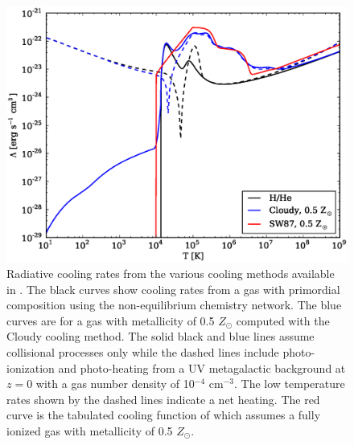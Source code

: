 \begin{figure} \label{fig.cooling}
  \begin{center}
    \includegraphics[width=1.0\textwidth]{figures/cooling_rate.eps}
    \caption{Radiative cooling rates from the various cooling methods
      available in \enzo.  The black curves show cooling rates from a gas
      with primordial composition using the non-equilibrium chemistry
      network.  The blue curves are for a gas with metallicity of 0.5
      $Z_{\odot}$ computed with the Cloudy cooling method.  The solid
      black and blue lines assume collisional processes only while the
      dashed lines include photo-ionization and photo-heating from a UV
      metagalactic background at $z = 0$ with a gas number density of
      10$^{-4}$ cm$^{-3}$.  The low temperature rates shown by the
      dashed lines indicate a net heating.  The red curve is the
      tabulated cooling function of \citet{SW87} which assumes a fully
      ionized gas with metallicity of 0.5 $Z_{\odot}$.}
  \end{center}
\end{figure}
